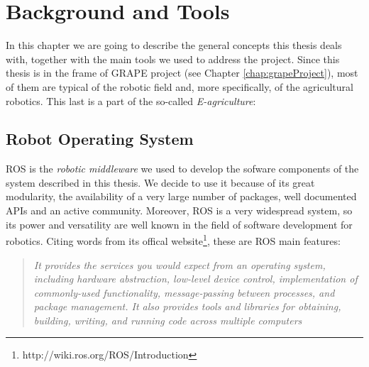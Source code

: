 
\chapter{Background and Tools} \label{chap:backgroundAndToolsChapter}

In this chapter we are going to describe the general concepts this thesis deals with, together with the main tools we used to address the project. Since this thesis is in the frame of \ac{GRAPE} project (see Chapter \ref{chap:grapeProject}),  most of them are typical of the robotic field and, more specifically, of the agricultural robotics. This last is a part of the so-called \textit{E-agriculture}: 


\section{Robot Operating System}\label{sec:robotOperatingSystem}
\ac{ROS} is the \textit{robotic middleware} we used to develop the sofware components of the system described in this thesis. We decide to use it because of its great modularity, the availability of a very large number of packages, well documented APIs and an active community. Moreover, \ac{ROS} is a very widespread system, so its power and versatility are well known in the field of software development for robotics. Citing words from its offical website\footnote{http://wiki.ros.org/ROS/Introduction},
these are \ac{ROS} main features: 
\blockquote{
\textit{It provides the services you would expect from an operating system, including hardware abstraction, low-level device control, implementation of commonly-used functionality, message-passing between processes, and package management. It also provides tools and libraries for obtaining, building, writing, and running code across multiple computers} %
} 

